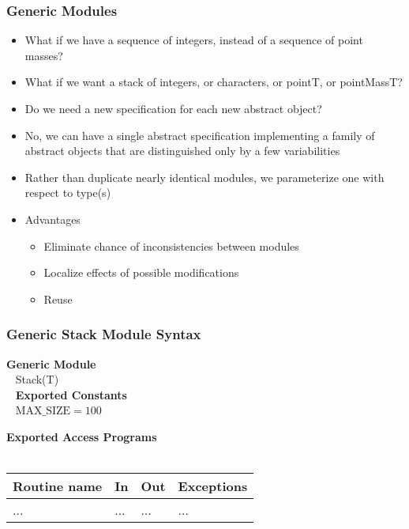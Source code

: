 \documentclass[t,12pt,numbers,fleqn,handout]{beamer}
\begin{document}
\begin{frame}
\frametitle{Generic Modules}

\begin{itemize}
\item What if we have a sequence of integers, instead of a sequence of point masses?
\item What if we want a stack of integers, or characters, or pointT, or pointMassT?
\item Do we need a new specification for each new abstract object?
\item No, we can have a single abstract specification implementing a family of abstract objects that are distinguished
only by a few variabilities
\item Rather than duplicate nearly identical modules, we parameterize one  with respect to
type(s)
\item Advantages
\begin{itemize}
\item Eliminate chance of inconsistencies between modules
\item Localize effects of possible modifications
\item Reuse
\end{itemize}
\end{itemize}

\end{frame}


\begin{frame}
\frametitle{Generic Stack Module Syntax}

\textbf{Generic Module}\\
~\newline
Stack(T)\\
~\newline
\textbf{Exported Constants}\\
~\newline
$\mbox{MAX\_SIZE} = 100$
~\newline

\textbf{Exported Access Programs}\\
~\newline
\begin{tabular}{| l | l | l | l |}
\hline
\textbf{Routine name} & \textbf{In} & \textbf{Out} & \textbf{Exceptions}\\
\hline
... & ... & ... & ...\\
\hline
\end{tabular}

\end{frame}
\end{document}
